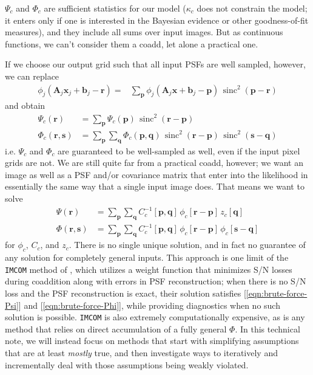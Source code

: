 \documentclass[DM,authoryear,toc]{lsstdoc}
\DeclareMathOperator{\sinc}{sinc}
\begin{document}
$\Psi_c$ and $\Phi_c$ are sufficient statistics for our model ($\kappa_c$ does not constrain the model; it enters only if one is interested in the Bayesian evidence or other goodness-of-fit measures), and they include all sums over input images.
But as continuous functions, we can't consider them a coadd, let alone a practical one.

If we choose our output grid such that all input PSFs are well sampled, however, we can replace
\begin{align}
    ϕ_j\!\left(\symbf{A}_j\symbf{x}_j + \symbf{b}_j - \symbf{r}\right) = &
        \sum_{\symbf{p}} ϕ_j\!\left(\symbf{A}_j\symbf{x} + \symbf{b}_j - \symbf{p}\right)
            \, \sinc^2(\symbf{p} - \symbf{r})
\end{align}
and obtain
\begin{align}
    \Psi_c(\symbf{r}) &= \sum_{\symbf{p}} \Psi_c(\symbf{p}) \, \sinc^2(\symbf{r} - \symbf{p}) \\
    \Phi_c(\symbf{r}, \symbf{s}) &= \sum_{\symbf{p}} \sum_{\symbf{q}} \Phi_c(\symbf{p}, \symbf{q})
        \, \sinc^2(\symbf{r} - \symbf{p})
        \, \sinc^2(\symbf{s} - \symbf{q})
\end{align}
i.e. $\Psi_c$ and $\Phi_c$ are guaranteed to be well-sampled as well, even if the input pixel grids are not.
We are still quite far from a practical coadd, however; we want an image as well as a PSF and/or covariance matrix that enter into the likelihood in essentially the same way that a single input image does.
That means we want to solve
\begin{align}
    \Psi(\symbf{r}) &= \sum_{\symbf{p}}\sum_{\symbf{q}} C^{-1}_c[\symbf{p}, \symbf{q}]
        \, \phi_c[\symbf{r} - \symbf{p}] \, z_c[\symbf{q}] \label{eqn:brute-force-Psi}\\
    \Phi(\symbf{r}, \symbf{s}) &= \sum_{\symbf{p}}\sum_{\symbf{q}} C^{-1}_c[\symbf{p}, \symbf{q}]
        \, \phi_c[\symbf{r} - \symbf{p}] \, \phi_c[\symbf{s} - \symbf{q}]
    \label{eqn:brute-force-Phi}
\end{align}
for $\phi_c$, $C_c$, and $z_c$.
There is no single unique solution, and in fact no guarantee of any solution for completely general inputs.
This approach is one limit of the \texttt{IMCOM} method of \citet{2011ApJ...741...46R}, which utilizes a weight function that minimizes S/N losses during coaddition along with errors in PSF reconstruction; when there is no S/N loss and the PSF reconstruction is exact, their solution satisfies [\ref{eqn:brute-force-Psi}] and [\ref{eqn:brute-force-Phi}], while providing diagnostics when no such solution is possible.
\texttt{IMCOM} is also extremely computationally expensive, as is any method that relies on direct accumulation of a fully general $\Phi$.
In this technical note, we will instead focus on methods that start with simplifying assumptions that are at least \emph{mostly} true, and then investigate ways to iteratively and incrementally deal with those assumptions being weakly violated.
\end{document}

